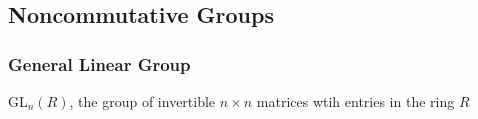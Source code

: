 \subsection{Noncommutative Groups}

\subsubsection{General Linear Group}\label{generallineargroup}
GL$_n(R)$, the group of invertible $n \times n$ matrices wtih entries in the ring $R$